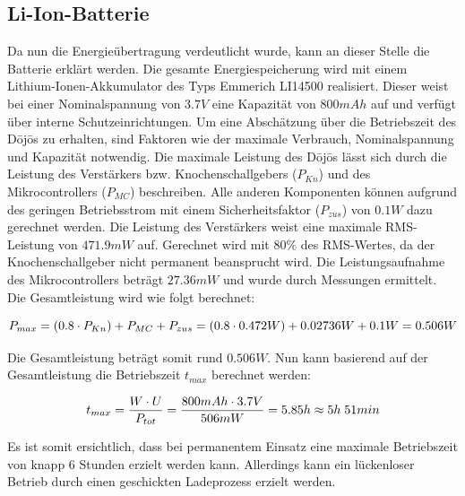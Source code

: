 \subsection{Li-Ion-Batterie}\label{sec:energiespeicher}
Da nun die Energieübertragung verdeutlicht wurde, kann an dieser Stelle die Batterie erklärt werden. Die gesamte Energiespeicherung wird mit einem Lithium-Ionen-Akkumulator des Typs Emmerich LI14500 realisiert. Dieser weist bei einer Nominalspannung von $3.7V$ eine Kapazität von $800mAh$ auf und verfügt über interne Schutzeinrichtungen. Um eine Abschätzung über die Betriebszeit des Dōjōs zu erhalten, sind Faktoren wie der maximale Verbrauch, Nominalspannung und Kapazität notwendig. Die maximale Leistung des Dōjōs lässt sich durch die Leistung des Verstärkers bzw. Knochenschallgebers ($P_{Kn}$) und des Mikrocontrollers ($P_{MC}$) beschreiben. Alle anderen Komponenten können aufgrund des geringen Betriebsstrom mit einem Sicherheitsfaktor ($P_{zus}$) von $0.1W$ dazu gerechnet werden. Die Leistung des Verstärkers weist eine maximale RMS-Leistung von $471.9mW$ auf. Gerechnet wird mit $80\%$ des RMS-Wertes, da der Knochenschallgeber nicht permanent beansprucht wird. Die Leistungsaufnahme des Mikrocontrollers beträgt $27.36mW$ und wurde durch Messungen ermittelt. Die Gesamtleistung wird wie folgt berechnet:

\begin{equation}
\centering
P_{max}=\left(0.8\cdot P_{Kn}\right)+P_{MC}+P_{zus}=(0.8\cdot 0.472W)+0.02736W+0.1W=0.506W
\label{eq:MaxLeistung}
\end{equation}

Die Gesamtleistung beträgt somit rund $0.506 W$. Nun kann basierend auf der Gesamtleistung die Betriebszeit $t_{max}$ berechnet werden:

\begin{equation}
\centering
t_{max}=\frac{W\cdot U}{P_{tot}}=\frac{800mAh \cdot 3.7V}{506mW}=5.85h\approx 5h \thickspace 51min
\label{eq:Betriebszeit}
\end{equation}

Es ist somit ersichtlich, dass bei permanentem Einsatz eine maximale Betriebszeit von knapp 6 Stunden erzielt werden kann. Allerdings kann ein lückenloser Betrieb durch einen geschickten Ladeprozess erzielt werden.

